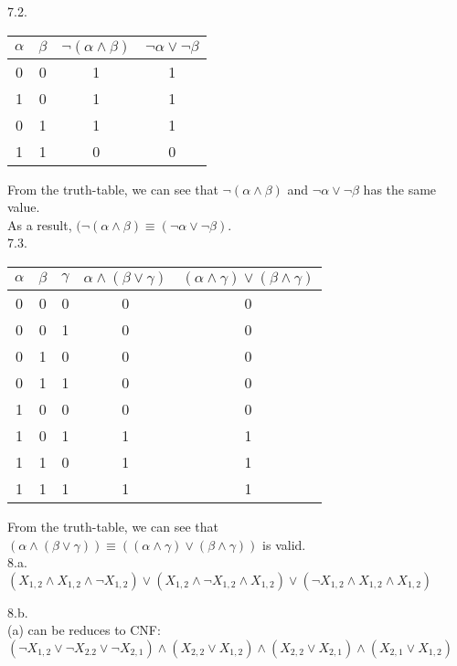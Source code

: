 \documentclass[a4paper]{article}
\begin{document}
7.2.\\
\begin{table}[!htb]
\centering
\begin{tabular}{|c|c|c|c|}
\hline
$\alpha$ & $\beta$ & $\neg (\alpha \wedge \beta)$ & $ \neg \alpha \vee \neg \beta$ \\ \hline
0 & 0 & 1 & 1 \\ \hline
1 & 0 & 1 & 1 \\ \hline
0 & 1 & 1 & 1 \\ \hline
1 & 1 & 0 & 0 \\ \hline
\end{tabular}
\end{table}
From the truth-table, we can see that $\neg (\alpha \wedge \beta)$ and $ \neg \alpha \vee \neg \beta$ has the same value. \\
As a result, $(\neg (\alpha \wedge \beta) \equiv (\neg \alpha \vee \neg \beta)$.\\

7.3.\\
\begin{table}[!htb]
\centering
\begin{tabular}{|c|c|c|c|c|}
\hline
$\alpha$ & $\beta$ & $\gamma$ & $\alpha \wedge (\beta \vee \gamma)$ & $(\alpha \wedge \gamma ) \vee (\beta \wedge \gamma)$ \\ \hline
0 & 0 & 0 & 0 & 0 \\ \hline
0 & 0 & 1 & 0 & 0 \\ \hline
0 & 1 & 0 & 0 & 0 \\ \hline
0 & 1 & 1 & 0 & 0 \\ \hline
1 & 0 & 0 & 0 & 0 \\ \hline
1 & 0 & 1 & 1 & 1 \\ \hline
1 & 1 & 0 & 1 & 1 \\ \hline
1 & 1 & 1 & 1 & 1 \\ \hline
\end{tabular}
\end{table}
From the truth-table, we can see that $(\alpha \wedge (\beta \vee \gamma)) \equiv ((\alpha \wedge \gamma ) \vee (\beta \wedge \gamma))$ is valid.\\

8.a.\\
$(X_{1,2} \wedge X_{1,2} \wedge \neg X_{1,2}) \vee (X_{1,2} \wedge \neg X_{1,2} \wedge  X_{1,2}) \vee ( \neg X_{1,2} \wedge X_{1,2} \wedge X_{1,2})$

8.b.\\
(a) can be reduces to CNF:\\
$(\neg X_{1,2} \vee \neg X_{2.2} \vee \neg X_{2,1}) \wedge (X_{2,2} \vee X_{1,2}) \wedge (X_{2,2} \vee X_{2,1}) \wedge (X_{2,1} \vee X_{1,2})$
\end{document}
